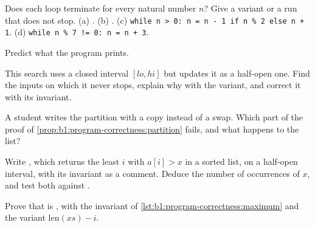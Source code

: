 \begin{exercise}[$\star$]\label{exo:b1:program-correctness:3}
Does each loop terminate for every natural number $n$? Give a variant or a run that does not stop.
(a) . (b) . (c) \texttt{while n > 0: n = n - 1 if n \% 2 else
n + 1}. (d) \texttt{while n \% 7 != 0: n = n + 3}.
\end{exercise}

\begin{exercise}[$\star$]\label{exo:b1:program-correctness:4}
Predict what the program prints.
\end{exercise}

\begin{exercise}[$\star\star$]\label{exo:b1:program-correctness:5}
This search uses a closed interval $[lo, hi]$ but updates it as a half-open one. Find the inputs on which it never
stops, explain why with the variant, and correct it with its invariant.
\end{exercise}

\begin{exercise}[$\star\star$]\label{exo:b1:program-correctness:6}
A student writes the partition with a copy instead of a swap. Which part of the proof of
\cref{prop:b1:program-correctness:partition} fails, and what happens to the list?
\end{exercise}

\begin{exercise}[$\star\star$]\label{exo:b1:program-correctness:7}
Write , which returns the least $i$ with $a[i] > x$ in a sorted list, on a half-open interval,
with its invariant as a comment. Deduce the number of occurrences of $x$, and test both against .
\end{exercise}

\begin{exercise}[$\star\star$]\label{exo:b1:program-correctness:8}
Prove that  is , with the invariant of \cref{lst:b1:program-correctness:maximum} and the
variant $\text{len}(xs) - i$.
\end{exercise}

